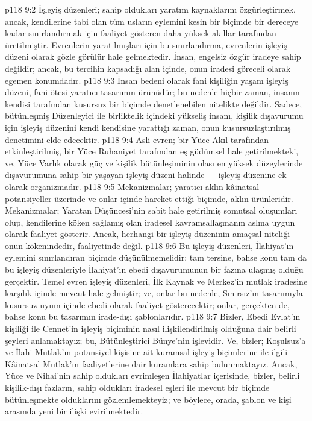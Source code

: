 \vs p118 9:2 İşleyiş düzenleri; sahip oldukları yaratım kaynaklarını özgürleştirmek, ancak, kendilerine tabi olan tüm usların eylemini kesin bir biçimde bir dereceye kadar sınırlandırmak için faaliyet gösteren daha yüksek akıllar tarafından üretilmiştir. Evrenlerin yaratılmışları için bu sınırlandırma, evrenlerin işleyiş düzeni olarak gözle görülür hale gelmektedir. İnsan, engelsiz özgür iradeye sahip değildir; ancak, bu tercihin kapsadığı alan içinde, onun iradesi göreceli olarak egemen konumdadır.
\vs p118 9:3 İnsan bedeni olarak fani kişiliğin yaşam işleyiş düzeni, fani\hyp{}ötesi yaratıcı tasarımın ürünüdür; bu nedenle hiçbir zaman, insanın kendisi tarafından kusursuz bir biçimde denetlenebilen nitelikte değildir. Sadece, bütünleşmiş Düzenleyici ile birliktelik içindeki yükseliş insanı, kişilik dışavurumu için işleyiş düzenini kendi kendisine yarattığı zaman, onun kusursuzlaştırılmış denetimini elde edecektir.
\vs p118 9:4 Asli evren; bir Yüce Akıl tarafından etkinleştirilmiş, bir Yüce Ruhaniyet tarafından eş güdümsel hale getirilmekteki, ve, Yüce Varlık olarak güç ve kişilik bütünleşiminin olası en yüksek düzeylerinde dışavurumuna sahip bir yaşayan işleyiş düzeni halinde --- işleyiş düzenine ek olarak organizmadır.
\vs p118 9:5 Mekanizmalar; yaratıcı aklın kâinatsal potansiyeller üzerinde ve onlar içinde hareket ettiği biçimde, aklın ürünleridir. Mekanizmalar; Yaratan Düşüncesi’nin sabit hale getirilmiş somutsal oluşumları olup, kendilerine köken sağlamış olan iradesel kavramsallaşmanın aslına uygun olarak faaliyet gösterir. Ancak, herhangi bir işleyiş düzeninin amaçsal niteliği onun kökenindedir, faaliyetinde değil.
\vs p118 9:6 Bu işleyiş düzenleri, İlahiyat’ın eylemini sınırlandıran biçimde düşünülmemelidir; tam tersine, bahse konu tam da bu işleyiş düzenleriyle İlahiyat’ın ebedi dışavurumunun bir fazına ulaşmış olduğu gerçektir. Temel evren işleyiş düzenleri, İlk Kaynak ve Merkez’in mutlak iradesine karşılık içinde mevcut hale gelmiştir; ve, onlar bu nedenle, Sınırsız’ın tasarımıyla kusursuz uyum içinde ebedi olarak faaliyet gösterecektir; onlar, gerçekten de, bahse konu bu tasarımın irade\hyp{}dışı şablonlarıdır.
\vs p118 9:7 Bizler, Ebedi Evlat’ın kişiliği ile Cennet’in işleyiş biçiminin nasıl ilişkilendirilmiş olduğuna dair belirli şeyleri anlamaktayız; bu, Bütünleştirici Bünye’nin işlevidir. Ve, bizler; Koşulsuz’a ve İlahi Mutlak’ın potansiyel kişisine ait kuramsal işleyiş biçimlerine ile ilgili Kâinatsal Mutlak’ın faaliyetlerine dair kuramlara sahip bulunmaktayız. Ancak, Yüce ve Nihai’nin sahip oldukları evrimleşen İlahiyatlar içerisinde, bizler, belirli kişilik\hyp{}dışı fazların, sahip oldukları iradesel eşleri ile mevcut bir biçimde bütünleşmekte olduklarını gözlemlemekteyiz; ve böylece, orada, şablon ve kişi arasında yeni bir ilişki evirilmektedir.
